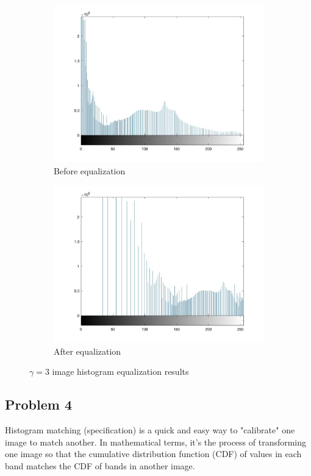 \documentclass[conference]{IEEEtran}
\begin{document}
\begin{figure}[h!]
\begin{subfigure}[b]{0.4\linewidth}
\includegraphics[width=\linewidth]{images/img21.jpg}
\caption{Before equalization}
\end{subfigure}
\begin{subfigure}[b]{0.4\linewidth}
\includegraphics[width=\linewidth]{images/img22.jpg}
\caption{After equalization}
\end{subfigure}
\caption{\(\gamma = 3\) image histogram equalization results}
\label{fig:a}
\end{figure}

\clearpage
\subsection{Problem 4}
Histogram matching (specification) is a quick and easy way to "calibrate" one image to match another. In mathematical terms, it's the process of transforming one image so that the cumulative distribution function (CDF) of values in each band matches the CDF of bands in another image.
\end{document}
